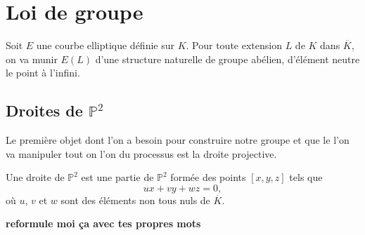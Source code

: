 \chapter{Loi de groupe}

Soit $E$ une courbe elliptique définie sur $K$. Pour toute extension $L$ de $K$ dans $\overline{K}$, on va munir $E(L)$ d'une structure naturelle de groupe abélien, d'élément neutre le point à l'infini.

\section{Droites de $\mathbb{P}^2$}
Le première objet dont l'on a besoin pour construire notre groupe et que le l'on va
manipuler tout on l'on du processus est la droite projective.

\begin{definition}
    Une droite de $\mathbb{P}^2$ est une partie de $\mathbb{P}^2$ formée des points $[x,y,z]$ tels que 
    \[
    ux+vy+wz=0
    ,\] 
    où $u$, $v$ et $w$ sont des éléments non tous nuls de $\overline{K}$.
\end{definition}

\textbf{reformule moi ça avec tes propres mots}

